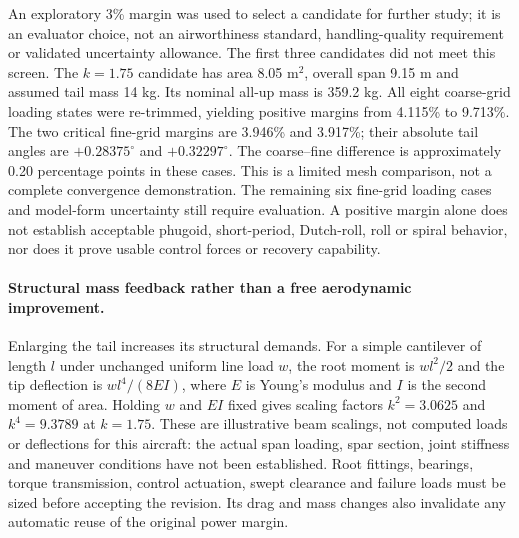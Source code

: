 \documentclass[10pt,letterpaper]{article}
\begin{document}
An exploratory 3\% margin was used to select a candidate for further study;
it is an evaluator choice, not an airworthiness standard, handling-quality
requirement or validated uncertainty allowance. The first three candidates
did not meet this screen. The $k=1.75$ candidate has area 8.05 m$^2$, overall
span 9.15 m and assumed tail mass 14 kg. Its nominal all-up mass is 359.2 kg.
All eight coarse-grid loading states were re-trimmed, yielding positive
margins from 4.115\% to 9.713\%. The two critical fine-grid margins are
3.946\% and 3.917\%; their absolute tail angles are $+0.28375^\circ$ and
$+0.32297^\circ$. The coarse--fine difference is approximately 0.20 percentage
points in these cases. This is a limited mesh comparison, not a complete
convergence demonstration. The remaining six fine-grid loading cases and
model-form uncertainty still require evaluation. A positive margin alone
does not establish acceptable phugoid, short-period, Dutch-roll, roll or spiral
behavior, nor does it prove usable control forces or recovery capability.

\paragraph{Structural mass feedback rather than a free aerodynamic improvement.}
Enlarging the tail increases its structural demands. For a simple cantilever
of length $l$ under unchanged uniform line load $w$, the root moment is
$wl^2/2$ and the tip deflection is $wl^4/(8EI)$, where $E$ is Young's modulus
and $I$ is the second moment of area. Holding $w$ and $EI$ fixed gives scaling
factors $k^2=3.0625$ and $k^4=9.3789$ at $k=1.75$. These are illustrative
beam scalings, not computed loads or deflections for this aircraft: the actual
span loading, spar section, joint stiffness and maneuver conditions have not
been established. Root fittings, bearings, torque transmission, control
actuation, swept clearance and failure loads must be sized before accepting
the revision. Its drag and mass changes also invalidate any automatic reuse
of the original power margin.
\end{document}
